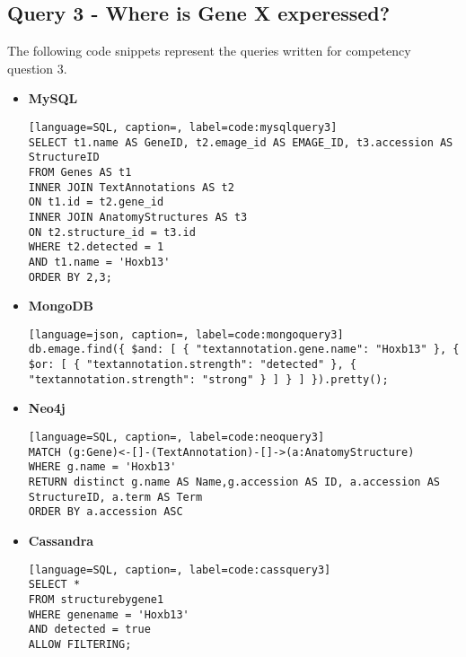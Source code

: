 \subsection*{Query 3 - Where is Gene X experessed?}\label{query3}
The following code snippets represent the queries written for competency question 3.
\begin{itemize}
\item \textbf{MySQL}
\begin{lstlisting}[language=SQL, caption=, label=code:mysqlquery3]
SELECT t1.name AS GeneID, t2.emage_id AS EMAGE_ID, t3.accession AS StructureID
FROM Genes AS t1
INNER JOIN TextAnnotations AS t2
ON t1.id = t2.gene_id
INNER JOIN AnatomyStructures AS t3
ON t2.structure_id = t3.id
WHERE t2.detected = 1
AND t1.name = 'Hoxb13'
ORDER BY 2,3;
\end{lstlisting}
\item \textbf{MongoDB}
\begin{lstlisting}[language=json, caption=, label=code:mongoquery3]
db.emage.find({ $and: [ { "textannotation.gene.name": "Hoxb13" }, { $or: [ { "textannotation.strength": "detected" }, { "textannotation.strength": "strong" } ] } ] }).pretty();
\end{lstlisting}
\item \textbf{Neo4j}
\begin{lstlisting}[language=SQL, caption=, label=code:neoquery3]
MATCH (g:Gene)<-[]-(TextAnnotation)-[]->(a:AnatomyStructure)
WHERE g.name = 'Hoxb13'
RETURN distinct g.name AS Name,g.accession AS ID, a.accession AS  StructureID, a.term AS Term
ORDER BY a.accession ASC
\end{lstlisting}
\item \textbf{Cassandra}
\begin{lstlisting}[language=SQL, caption=, label=code:cassquery3]
SELECT *
FROM structurebygene1
WHERE genename = 'Hoxb13'
AND detected = true
ALLOW FILTERING;
\end{lstlisting}
\end{itemize}
